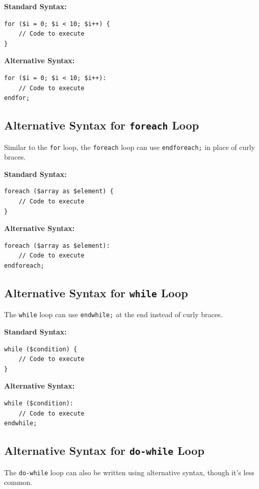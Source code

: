 \documentclass[11pt]{article}
\begin{document}
\textbf{Standard Syntax:}

\begin{verbatim}
for ($i = 0; $i < 10; $i++) {
    // Code to execute
}
\end{verbatim}

\textbf{Alternative Syntax:}

\begin{verbatim}
for ($i = 0; $i < 10; $i++):
    // Code to execute
endfor;
\end{verbatim}

\subsection{Alternative Syntax for \texttt{foreach} Loop}
\label{sec:org9c91092}
Similar to the \texttt{for} loop, the \texttt{foreach} loop can use \texttt{endforeach;} in
place of curly braces.

\textbf{Standard Syntax:}

\begin{verbatim}
foreach ($array as $element) {
    // Code to execute
}
\end{verbatim}

\textbf{Alternative Syntax:}

\begin{verbatim}
foreach ($array as $element):
    // Code to execute
endforeach;
\end{verbatim}

\subsection{Alternative Syntax for \texttt{while} Loop}
\label{sec:org76e70f1}
The \texttt{while} loop can use \texttt{endwhile;} at the end instead of curly braces.

\textbf{Standard Syntax:}

\begin{verbatim}
while ($condition) {
    // Code to execute
}
\end{verbatim}

\textbf{Alternative Syntax:}

\begin{verbatim}
while ($condition):
    // Code to execute
endwhile;
\end{verbatim}

\subsection{Alternative Syntax for \texttt{do-while} Loop}
\label{sec:org6833352}
The \texttt{do-while} loop can also be written using alternative syntax, though
it's less common.
\end{document}
